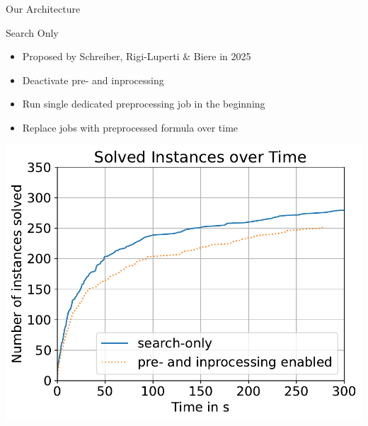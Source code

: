 \documentclass[]{sdqbeamer}
\begin{document}
\begin{frame}{Our Architecture}
    \begin{minipage}{0.45\textwidth}
        \center
        \begin{block}{Search Only}
            \begin{itemize}
                \item Proposed by Schreiber, Rigi-Luperti \& Biere in 2025
                \item Deactivate pre- and inprocessing
                \item Run single dedicated preprocessing job in the beginning
                \item Replace jobs with preprocessed formula over time
            \end{itemize}
        \end{block}
    \end{minipage}%
    \hfill
    \begin{minipage}{0.45\textwidth}
        \center
        \includegraphics[scale=.8]{plots/config_compare/search_only_compare.pdf}
    \end{minipage}%

\end{frame}

\end{document}

